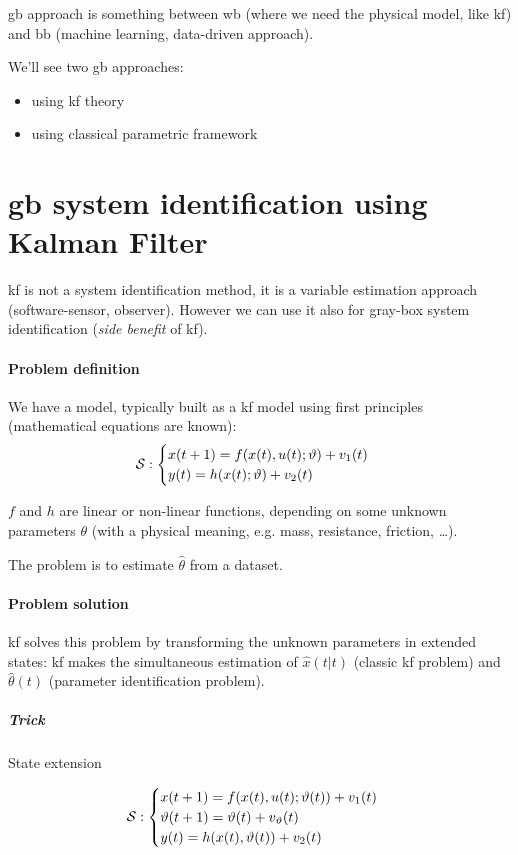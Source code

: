 
\acrfull{gb} approach is something between \acrlong{wb} (where we need the physical model, like \gls{kf}) and \acrlong{bb} (machine learning, data-driven approach).

We'll see two \gls{gb} approaches:
\begin{itemize}
    \item using \gls{kf} theory
    \item using classical parametric framework
\end{itemize}

\section{\gls{gb} system identification using Kalman Filter}
\acrlong{kf} is not a system identification method, it is a variable estimation approach (software-sensor, observer).
However we can use it also for gray-box system identification (\emph{side benefit} of \gls{kf}).

\paragraph{Problem definition} We have a model, typically built as a \gls{kf} model using first principles (mathematical equations are known):
\[
    \mathcal{S}: \begin{cases}
        x(t+1) = f(x(t), u(t); \vartheta) + v_1(t) \\
        y(t) = h(x(t); \vartheta) + v_2(t)
    \end{cases}
\]

$f$ and $h$ are linear or non-linear functions, depending on some unknown parameters $\theta$ (with a physical meaning, e.g. mass, resistance, friction, \dots).

The problem is to estimate $\hat{\theta}$ from a dataset.

\paragraph{Problem solution}

\gls{kf} solves this problem by transforming the unknown parameters in extended states: \gls{kf} makes the simultaneous estimation of $\hat{x}(t|t)$ (classic \gls{kf} problem) and $\hat{\theta}(t)$ (parameter identification problem).

\subparagraph{Trick} State extension

\[
    \mathcal{S}: \begin{cases}
        x(t+1) = f(x(t), u(t); \vartheta(t)) + v_1(t) \\
        \vartheta(t+1) = \vartheta(t) + v_\vartheta(t) \\
        y(t) = h(x(t), \vartheta(t)) + v_2(t)
    \end{cases}
\]


